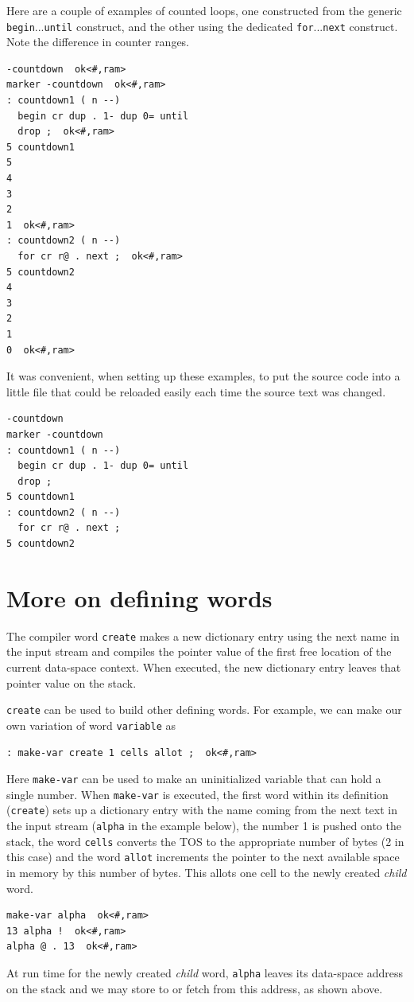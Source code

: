 \documentclass[12pt,a4paper]{article}
\begin{document}
\medskip
Here are a couple of examples of counted loops, 
one constructed from the generic \verb!begin!...\verb!until! construct,
and the other using the dedicated \verb!for!...\verb!next! construct.
Note the difference in counter ranges.
\begin{verbatim}
-countdown  ok<#,ram>
marker -countdown  ok<#,ram>
: countdown1 ( n --) 
  begin cr dup . 1- dup 0= until 
  drop ;  ok<#,ram>
5 countdown1 
5 
4 
3 
2 
1  ok<#,ram>
: countdown2 ( n --) 
  for cr r@ . next ;  ok<#,ram>
5 countdown2 
4 
3 
2 
1 
0  ok<#,ram>
\end{verbatim}
It was convenient, when setting up these examples, to put the source code into a little file
that could be reloaded easily each time the source text was changed.
\begin{verbatim}
-countdown
marker -countdown
: countdown1 ( n --)
  begin cr dup . 1- dup 0= until
  drop ;
5 countdown1
: countdown2 ( n --)
  for cr r@ . next ;
5 countdown2
\end{verbatim}


\bigskip
\section{More on defining words}
\label{sec:more-defining-words}
%
The compiler word \verb!create! makes a new dictionary entry 
using the next name in the input stream and compiles the pointer value 
of the first free location of the current data-space context.
When executed, the new dictionary entry leaves that pointer value on the stack.

\medskip
\verb!create! can be used to build other defining words.
For example, we can make our own variation of word \verb!variable! as
\begin{verbatim}
: make-var create 1 cells allot ;  ok<#,ram>
\end{verbatim}
Here \verb!make-var! can be used to make an uninitialized variable that can hold a single number.
When \verb!make-var! is executed, the first word within its definition (\verb!create!)
sets up a dictionary entry with the name coming from the next text in the input stream
(\verb!alpha! in the example below),
the number 1 is pushed onto the stack, the word \verb!cells! converts the TOS to the 
appropriate number of bytes (2 in this case) and the word \verb!allot! increments
the pointer to the next available space in memory by this number of bytes.
This allots one cell to the newly created \textit{child} word.
\begin{verbatim}
make-var alpha  ok<#,ram>
13 alpha !  ok<#,ram>
alpha @ . 13  ok<#,ram>
\end{verbatim}
At run time for the newly created \textit{child} word, \verb!alpha! leaves its data-space address on the stack
and we may store to or fetch from this address, as shown above.
\end{document}
